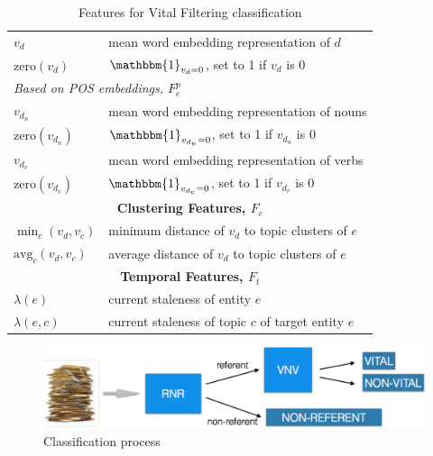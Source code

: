 \documentclass{article}
\begin{document}
\begin{table}[tb]
{\begin{tabular}{p{}p{}}
  $v_d$ & mean word embedding representation of $d$ \\
  $\text{zero}(v_d)$& $\mathbbm{1}_{v_d=0}$, set to 1 if $v_d$ is $0$ \\
\multicolumn{2}{l}{\emph{Based on POS embeddings, $F_e^p$}} \\ %
  $v_{d_n}$ & mean word embedding representation of nouns\\ %
  $\text{zero}(v_{d_n})$& $\mathbbm{1}_{v_{d_n}=0}$, set to 1 if $v_{d_n}$ is $0$ \\
  $v_{d_v}$ & mean word embedding representation of verbs \\ %
  $\text{zero}(v_{d_v})$& $\mathbbm{1}_{v_{d_v}=0}$, set to 1 if $v_{d_v}$ is $0$ \\
\midrule
\multicolumn{2}{c}{\textbf{Clustering Features, $F_c$}} \\ %
\midrule
  $\min_c(v_d,v_c)$& minimum distance of $v_d$ to topic clusters of $e$ \\
  $\text{avg}_c(v_d,v_c)$& average distance of $v_d$ to topic clusters of $e$ \\
\midrule
\multicolumn{2}{c}{\textbf{Temporal Features, $F_t$}} \\ %
\midrule
  $\lambda(e)$& current staleness of entity $e$ \\
  $\lambda(e,c)$& current staleness of topic $c$ of target entity $e$ \\
\bottomrule
\end{tabular}
} %
\caption{Features for Vital Filtering classification}
\label{features}
\end{table}



\begin{figure}[tb]
\centering
\includegraphics[width=1\columnwidth]{fig/classifier.pdf}
\caption{Classification process}
\label{classifier}
\end{figure}
\end{document}

